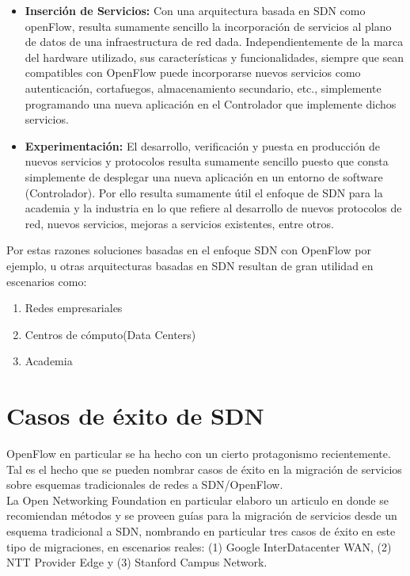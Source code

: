 \begin{itemize}
\item \textbf{Inserción de Servicios:}
Con una arquitectura basada en SDN como openFlow, resulta sumamente sencillo la incorporación de servicios al plano de datos de una infraestructura de red dada. Independientemente de la marca del hardware utilizado, sus características y funcionalidades, siempre que sean compatibles con OpenFlow puede incorporarse nuevos servicios como autenticación, cortafuegos, almacenamiento secundario, etc., simplemente programando una nueva aplicación en el Controlador que implemente dichos servicios.

\item \textbf{Experimentación:}
El desarrollo, verificación y puesta en producción de nuevos servicios y protocolos resulta sumamente sencillo puesto que consta simplemente de desplegar una nueva aplicación en un entorno de software (Controlador). Por ello resulta sumamente útil el enfoque de SDN para la academia y la industria en lo que refiere al desarrollo de nuevos protocolos de red, nuevos servicios, mejoras a servicios existentes, entre otros.

\end{itemize}

Por estas razones soluciones basadas en el enfoque SDN con OpenFlow por ejemplo, u otras arquitecturas basadas en SDN resultan de gran utilidad en escenarios como:

\begin{enumerate}
\item Redes empresariales
\item Centros de cómputo(Data Centers)
\item Academia
\end{enumerate}

\section{Casos de éxito de SDN}
OpenFlow en particular se ha hecho con un cierto protagonismo recientemente. Tal es el hecho que se pueden nombrar casos de éxito en la migración de servicios sobre esquemas tradicionales de redes a SDN/OpenFlow.\\

La Open Networking Foundation en particular elaboro un articulo\cite{ONFSuccessCase} en donde se recomiendan métodos y se proveen guías para la migración de servicios desde un esquema tradicional a SDN, nombrando en particular tres casos de éxito en este tipo de migraciones, en escenarios reales: (1) Google InterDatacenter
WAN, (2) NTT Provider Edge y (3) Stanford Campus Network.

